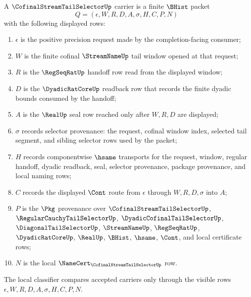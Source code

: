 \begin{definition}
\label{def:cofinal-stream-tail-selector-carrier}
A $\CofinalStreamTailSelectorUp$ carrier is a finite $\BHist$ packet
$$
Q=(\epsilon,W,R,D,A,\sigma,H,C,P,N)
$$
with the following displayed rows:
\begin{enumerate}
\item $\epsilon$ is the positive precision request made by the completion-facing consumer;
\item $W$ is the finite cofinal $\StreamNameUp$ tail window opened at that request;
\item $R$ is the $\RegSeqRatUp$ handoff row read from the displayed window;
\item $D$ is the $\DyadicRatCoreUp$ readback row that records the finite dyadic bounds consumed by the handoff;
\item $A$ is the $\RealUp$ seal row reached only after $W,R,D$ are displayed;
\item $\sigma$ records selector provenance: the request, cofinal window index, selected tail segment, and sibling selector rows used by the packet;
\item $H$ records componentwise $\hsame$ transports for the request, window, regular handoff, dyadic readback, seal, selector provenance, package provenance, and local naming rows;
\item $C$ records the displayed $\Cont$ route from $\epsilon$ through $W,R,D,\sigma$ into $A$;
\item $P$ is the $\Pkg$ provenance over $\CofinalStreamTailSelectorUp$, $\RegularCauchyTailSelectorUp$, $\DyadicCofinalTailSelectorUp$, $\DiagonalTailSelectorUp$, $\StreamNameUp$, $\RegSeqRatUp$, $\DyadicRatCoreUp$, $\RealUp$, $\BHist$, $\hsame$, $\Cont$, and local certificate rows;
\item $N$ is the local $\NameCert_{\CofinalStreamTailSelectorUp}$ row.
\end{enumerate}
The local classifier compares accepted carriers only through the visible rows $\epsilon,W,R,D,A,\sigma,H,C,P,N$.
\end{definition}

